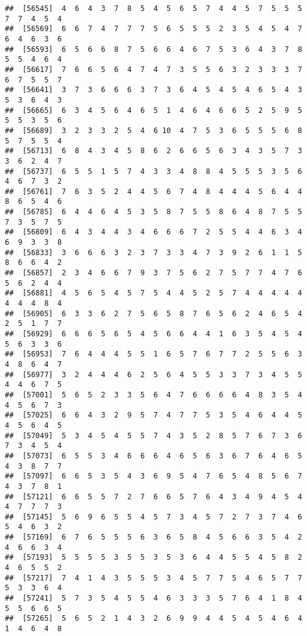 \documentclass[
]{book}
\begin{document}
\begin{verbatim}
##  [56545]  4  6  4  3  7  8  5  4  5  6  5  7  4  4  5  7  5  5  5  7  7  4  5  4
##  [56569]  6  6  7  4  7  7  7  5  6  5  5  5  2  3  5  4  5  4  7  6  4  6  3  6
##  [56593]  6  5  6  6  8  7  5  6  6  4  6  7  5  3  6  4  3  7  8  5  5  4  6  4
##  [56617]  7  6  6  5  6  4  7  4  7  3  5  5  6  3  2  3  3  3  7  6  7  5  5  7
##  [56641]  3  7  3  6  6  6  3  7  3  6  4  5  4  5  4  6  5  4  3  5  3  6  4  3
##  [56665]  6  3  4  5  6  4  6  5  1  4  6  4  6  6  5  2  5  9  5  5  5  3  5  6
##  [56689]  3  2  3  3  2  5  4  6 10  4  7  5  3  6  5  5  5  6  8  5  7  5  5  4
##  [56713]  6  8  4  3  4  5  8  6  2  6  6  5  6  3  4  3  5  7  3  3  6  2  4  7
##  [56737]  6  5  5  1  5  7  4  3  3  4  8  8  4  5  5  5  3  5  6  4  6  7  3  2
##  [56761]  7  6  3  5  2  4  4  5  6  7  4  8  4  4  4  5  6  4  4  8  6  5  4  6
##  [56785]  6  4  4  6  4  5  3  5  8  7  5  5  8  6  4  8  7  5  5  7  3  5  7  5
##  [56809]  6  4  3  4  4  3  4  6  6  6  7  2  5  5  4  4  6  3  4  6  9  3  3  8
##  [56833]  3  6  6  6  3  2  3  7  3  3  4  7  3  9  2  6  1  1  5  8  6  6  4  2
##  [56857]  2  3  4  6  6  7  9  3  7  5  6  2  7  5  7  7  4  7  6  5  6  2  4  4
##  [56881]  4  5  6  5  4  5  7  5  4  4  5  2  5  7  4  4  4  4  4  4  4  4  8  4
##  [56905]  6  3  3  6  2  7  5  6  5  8  7  6  5  6  2  4  6  5  4  2  5  1  7  7
##  [56929]  6  6  6  5  6  5  4  5  6  6  4  4  1  6  3  5  4  5  4  5  6  3  3  6
##  [56953]  7  6  4  4  4  5  5  1  6  5  7  6  7  7  2  5  5  6  3  4  8  6  4  7
##  [56977]  3  2  4  4  4  6  2  5  6  4  5  5  3  3  7  3  4  5  5  4  4  6  7  5
##  [57001]  5  6  5  2  3  3  5  6  4  7  6  6  6  6  4  8  3  5  4  4  5  6  7  3
##  [57025]  6  6  4  3  2  9  5  7  4  7  7  5  3  5  4  6  4  4  5  4  5  6  4  5
##  [57049]  5  3  4  5  4  5  5  7  4  3  5  2  8  5  7  6  7  3  6  7  3  4  5  4
##  [57073]  6  5  5  3  4  6  6  6  4  6  5  6  3  6  7  6  4  6  5  4  3  8  7  7
##  [57097]  6  6  5  3  5  4  3  6  9  5  4  7  6  5  4  8  5  6  7  4  3  7  8  1
##  [57121]  6  6  5  5  7  2  7  6  6  5  7  6  4  3  4  9  4  5  4  4  7  7  7  3
##  [57145]  5  6  9  6  5  5  4  5  7  3  4  5  7  2  7  3  7  4  6  5  4  6  3  2
##  [57169]  6  7  6  5  5  5  6  3  6  5  8  4  5  6  6  3  5  4  2  4  6  6  3  4
##  [57193]  5  5  5  5  3  5  5  3  5  3  6  4  4  5  5  4  5  8  2  4  6  5  5  2
##  [57217]  7  4  1  4  3  5  5  5  3  4  5  7  7  5  4  6  5  7  7  5  3  3  6  4
##  [57241]  5  7  3  5  4  5  5  4  6  3  3  3  5  7  6  4  1  8  4  5  5  6  6  5
##  [57265]  5  6  5  2  1  4  3  2  6  9  9  4  4  5  4  5  4  6  4  1  4  6  4  8

\end{verbatim}
\end{document}

